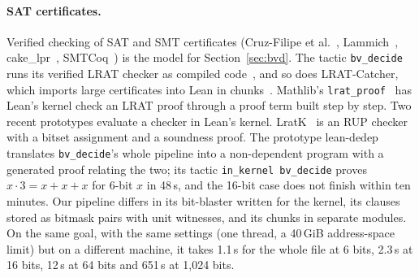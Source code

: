 \documentclass[11pt]{article}
\begin{document}
\paragraph{SAT certificates.} Verified checking of SAT and SMT certificates (Cruz-Filipe et
al.~\cite{cruz}, Lammich~\cite{lammich}, cake\_lpr~\cite{cakelpr}, SMTCoq~\cite{smtcoq}) is the
model for Section~\ref{sec:bvd}. The tactic \texttt{bv\_decide} runs its verified LRAT checker as compiled
code~\cite{bvdecide}, and so does LRAT-Catcher, which imports large certificates into Lean in
chunks~\cite{lratcatcher}. Mathlib's \texttt{lrat\_proof}~\cite{fromlrat} has Lean's kernel check an
LRAT proof through a proof term built step by step. Two recent prototypes evaluate a checker in
Lean's kernel. LratK~\cite{lratk} is an RUP checker with a bitset assignment and a soundness proof.
The prototype lean-dedep~\cite{dedep} translates \texttt{bv\_decide}'s whole pipeline into a non-dependent
program with a generated proof relating the two; its tactic \texttt{in\_kernel bv\_decide} proves
\(x \cdot 3 = x + x + x\) for 6-bit \(x\) in 48\,s, and the 16-bit case does not finish within ten
minutes. Our pipeline differs in its bit-blaster written for the kernel, its clauses stored as bitmask
pairs with unit witnesses, and its chunks in separate modules. On the same goal, with the same
settings (one thread, a 40\,GiB address-space limit) but on a different machine, it takes 1.1\,s for
the whole file at 6 bits, 2.3\,s at 16 bits, 12\,s at 64 bits and 651\,s at 1,024 bits.
\end{document}
